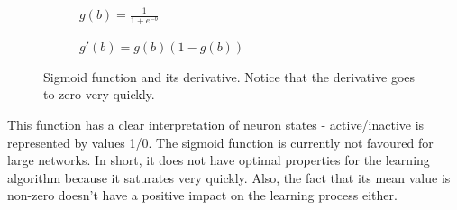 \begin{figure}[h]  
	\centering 
	\begin{subfigure}[b]{0.4\linewidth}
		\caption{$ g(b)=\frac{1}{1 + e^{-b}} $}   
	\end{subfigure}
	\begin{subfigure}[b]{0.4\linewidth}
		\caption{$ g'(b)=g(b)(1-g(b)) $}  
	\end{subfigure}
	\vspace{10mm}
	\caption{Sigmoid function and its derivative. Notice that the derivative goes to zero very quickly.}
\end{figure}

%		


This function has a clear interpretation of neuron states - active/inactive is represented by values 1/0. The sigmoid function is currently not favoured for large networks. In short, it does not have optimal properties for the learning algorithm because it saturates very quickly. Also, the fact that its mean value is non-zero doesn't have a positive impact on the learning process either. \cite{stanford-github} \cite{groman}

